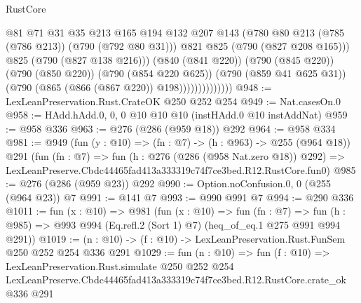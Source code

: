 \begin{lexlean}{RustCore}
\begin{coremodule}
                                @81
                                @71
                                @31
                                @35
                                @213
                                @165
                                @194
                                @132
                                @207
                                @143
                                (@780 @80 @213 (@785 (@786 @213)) (@790 (@792 @80 @31)))
                                @821
                                @825
                                (@790 (@827 @208 @165)))
                              @825
                              (@790 (@827 @138 @216)))
                            (@840 (@841 @220))
                            (@790 (@845 @220))
                            (@790 (@850 @220))
                            (@790 (@854 @220 @625))
                            (@790 (@859 @41 @625 @31))
                            (@790 (@865 (@866 (@867 @220)) @198))))))))))))))
@948 := LexLeanPreservation.Rust.CrateOK @250 @252 @254
@949 := Nat.casesOn.{0}
@958 := HAdd.hAdd.{0, 0, 0} @10 @10 @10 (instHAdd.{0} @10 instAddNat)
@959 := @958 @336
@963 := @276 (@286 (@959 @18)) @292
@964 := @958 @334
@981 := @949
    (fun (y : @10) => (fn : @7) -> (h : @963) -> @255 (@964 @18))
    @291
    (fun (fn : @7) =>
    fun (h : @276 (@286 (@958 Nat.zero @18)) @292) =>
    LexLeanPreserve.Cbdc44465fad413a333319c74f7ce3bed.R12.RustCore.fun0)
@985 := @276 (@286 (@959 @23)) @292
@990 := Option.noConfusion.{0, 0} (@255 (@964 @23)) @7
@991 := @141 @7
@993 := @990 @991 @7
@994 := @290 @336
@1011 := fun (x : @10) =>
  @981
    (fun (x : @10) =>
    fun (fn : @7) =>
    fun (h : @985) => @993 @994 (Eq.refl.{2} (Sort 1) @7) (heq_of_eq.{1} @275 @991 @994 @291))
@1019 := (n : @10) -> (f : @10) -> LexLeanPreservation.Rust.FunSem @250 @252 @254 @336 @291
@1029 := fun (n : @10) =>
  fun (f : @10) =>
  LexLeanPreservation.Rust.simulate
    @250
    @252
    @254
    LexLeanPreserve.Cbdc44465fad413a333319c74f7ce3bed.R12.RustCore.crate_ok
    @336
    @291
\end{coremodule}
\end{lexlean}
